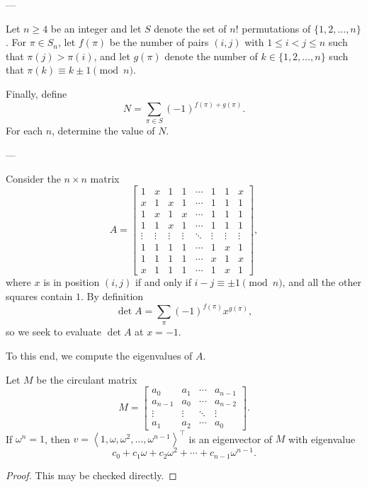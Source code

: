 
---

Let $n\ge4$ be an integer and let $S$ denote the set of $n!$ permutations of $\{1,2,\ldots,n\}$. For $\pi\in S_n$, let $f(\pi)$ be the number of pairs $(i,j)$ with $1\le i<j\le n$ such that $\pi(j)>\pi(i)$, and let $g(\pi)$ denote the number of $k\in\{1,2,\ldots,n\}$ such that $\pi(k)\equiv k\pm1\pmod n$.

Finally, define \[N=\sum_{\pi\in S}(-1)^{f(\pi)+g(\pi)}.\]
For each $n$, determine the value of $N$.

---

Consider the $n\times n$ matrix \[A=\begin{bmatrix}
    1&x&1&1&\cdots&1&1&x\\
    x&1&x&1&\cdots&1&1&1\\
    1&x&1&x&\cdots&1&1&1\\
    1&1&x&1&\cdots&1&1&1\\
    \vdots&\vdots&\vdots&\vdots&\ddots&\vdots&\vdots&\vdots\\
    1&1&1&1&\cdots&1&x&1\\
    1&1&1&1&\cdots&x&1&x\\
    x&1&1&1&\cdots&1&x&1
\end{bmatrix},\]
where $x$ is in position $(i,j)$ if and only if $i-j\equiv\pm1\pmod n$, and all the other squares contain $1$. By definition \[\det A=\sum_\pi(-1)^{f(\pi)}x^{g(\pi)},\]
so we seek to evaluate $\det A$ at $x=-1$.

To this end, we compute the eigenvalues of $A$.
\begin{boxlemma*}
    Let $M$ be the circulant matrix \[M=\begin{bmatrix}
            a_0&a_1&\cdots&a_{n-1}\\
            a_{n-1}&a_0&\cdots&a_{n-2}\\
            \vdots&\vdots&\ddots&\vdots\\
            a_1&a_2&\cdots&a_0
    \end{bmatrix}.\]
    If $\omega^n=1$, then $v=\left<1,\omega,\omega^2,\ldots,\omega^{n-1}\right>^\top$ is an eigenvector of $M$ with eigenvalue \[c_0+c_1\omega+c_2\omega^2+\cdots+c_{n-1}\omega^{n-1}.\]
\end{boxlemma*}
\begin{proof}
    This may be checked directly.
\end{proof}


